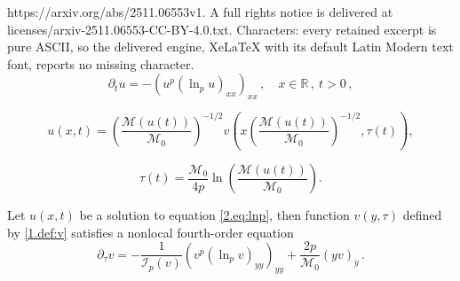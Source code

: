 \documentclass[10pt,a4paper]{amsart}
\let\pa\partial
\newcommand{\I}{\mathcal{I}}
\newcommand{\M}{\mathcal{M}}
\newcommand{\R}{{\mathbb R}}
\begin{document}
https://arxiv.org/abs/2511.06553v1. A full rights notice is delivered at licenses/arxiv-2511.06553-CC-BY-4.0.txt. Characters: every retained excerpt is pure ASCII, so the delivered engine, XeLaTeX with its default Latin Modern text font, reports no missing character.
\begin{equation}\label{2.eq:lnp}
    \pa_t u = -\left(u^p\left(\ln_p u\right)_{xx}\right)_{xx}\,, \quad x\in\R\,,\ t>0\,,
\end{equation}

\begin{equation}\label{1.def:v}
    u(x,t) = \left(\frac{\M(u(t))}{\M_0}\right)^{-1/2} v \left(x\left(\frac{\M(u(t))}{\M_0}\right)^{-1/2}, \tau(t)\right),
\end{equation}

\begin{equation}\label{1.def:tau}
    \tau(t) = \frac{\M_0}{4p}\ln\left(\frac{\M(u(t))}{\M_0}\right).
\end{equation}

\begin{proposition}
    Let $u(x,t)$ be a solution to equation \eqref{2.eq:lnp}, then function $v(y,\tau)$ defined by \eqref{1.def:v} satisfies a nonlocal fourth-order equation
    \begin{equation}\label{2.eq:v_p}
        \pa_\tau v = -\frac{1}{\I_p(v)}\left(v^p\left(\ln_{p}v\right)_{yy}\right)_{yy} + \frac{2p}{\M_0}(y v)_y\,.
    \end{equation}
\end{proposition}
\end{document}
